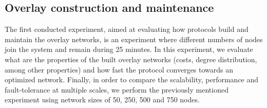 \begin{table} \label{table:proto_test_params}
    \caption{Protocol test configuration parameters}
\end{table}

\subsection{Overlay construction and maintenance}

The first conducted experiment, aimed at evaluating how protocols build and maintain the overlay networks, is an experiment where different numbers of nodes join the system and remain during 25 minutes. In this experiment, we evaluate what are the properties of the built overlay networks (costs, degree distribution, among other properties) and how fast the protocol converges towards an optimized network. Finally, in order to compare the scalability, performance and fault-tolerance at multiple scales, we perform the previously mentioned experiment using network sizes of 50, 250, 500 and 750 nodes.

